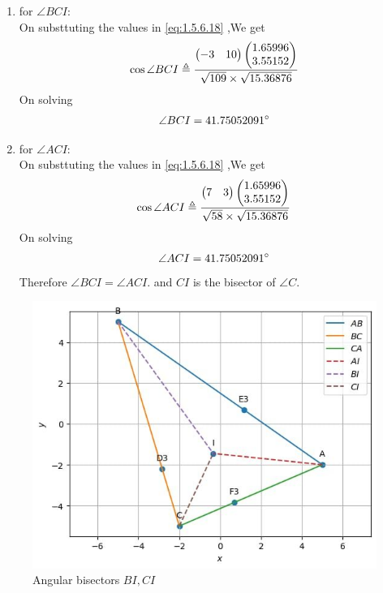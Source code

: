 \documentclass[11pt]{book}
\begin{document}
\begin{enumerate}[label=\thesection.\arabic*.,ref=\thesection.\theenumi]
\begin{enumerate}
\begin{enumerate}
    \item for $\angle BCI$: \\
    On substtuting the values in  \eqref{eq:1.5.6.18} ,We get 
    \begin{align}
        \cos{\angle BCI} \triangleq \frac{\begin{pmatrix} -3 & 10\end{pmatrix}\begin{pmatrix}1.65996 \\ 3.55152\end{pmatrix}}{ \sqrt{109}\times \sqrt{15.36876}} \\
    \end{align}
    On solving 
    \begin{align}
        \angle BCI = 41.75052091 \degree
    \end{align}
       \item for $\angle ACI$: \\
    On substtuting the values in  \eqref{eq:1.5.6.18} ,We get 
    \begin{align}
        \cos{\angle ACI} \triangleq \frac{\begin{pmatrix} 7 & 3\end{pmatrix}\begin{pmatrix}1.65996 \\ 3.55152\end{pmatrix}}{ \sqrt{58} \times \sqrt{15.36876}} \\
    \end{align}
    On solving 
    \begin{align}
        \angle ACI = 41.75052091 \degree
    \end{align}
    Therefore $\angle BCI = \angle ACI.$ and $CI$ is the bisector of $\angle C$. 
\end{enumerate}
\begin{figure}[H]
\includegraphics[width=\columnwidth]{figs/5000.jpg}
\caption{Angular bisectors  $BI, CI$}
\label{fig:fig5}
\end{figure}
\end{enumerate}

\end{enumerate}
\end{document}

